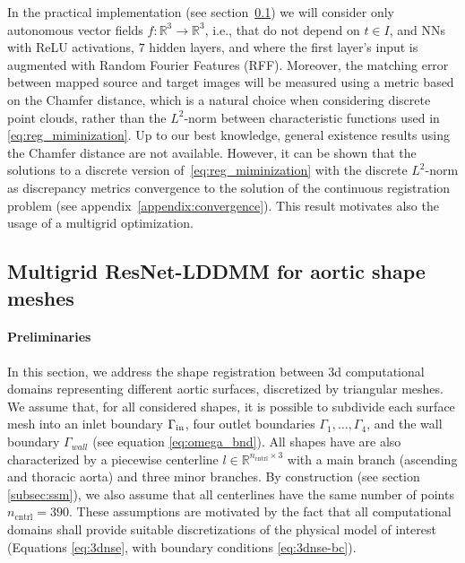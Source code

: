 In the practical implementation (see section~\ref{subsec:resnetlddmm}) we will 
consider only autonomous vector fields $f:\mathbb{R}^3\rightarrow \mathbb{R}^3$, i.e., that do not depend on $t\in I$,  and
NNs with ReLU activations, $7$ hidden layers, and where the first layer's input is augmented with Random Fourier Features (RFF).
%
Moreover, the matching error between mapped source and target images will be measured using a metric based on the Chamfer distance, which is a natural choice
when considering discrete point clouds, rather than the $L^2$-norm between characteristic functions used in \eqref{eq:reg_miminization}.
Up to our best knowledge, general existence results using the Chamfer distance are not available. However, it can be
shown that the solutions to a discrete version of~\eqref{eq:reg_miminization} with the discrete $L^2$-norm as discrepancy metrics convergence to the solution of the continuous registration problem (see appendix~\ref{appendix:convergence}). This result motivates also the usage of a multigrid optimization.

\subsection{Multigrid ResNet-LDDMM for aortic shape meshes}
\label{subsec:resnetlddmm}

\paragraph{Preliminaries} 
In this section, we address the shape registration between 3d computational domains representing different aortic surfaces, discretized by triangular meshes.  
%
We assume that, for all considered shapes, it is possible to subdivide each surface mesh into an inlet boundary $\Gamma_{\rm in}$, four outlet boundaries $\Gamma_1, \hdots,\Gamma_4$, 
and the wall boundary $\Gamma_{wall}$ (see equation \eqref{eq:omega_bnd}).
%
All shapes have are also characterized by a piecewise centerline $l\in\mathbb{R}^{n_{\text{cntrl}}\times 3}$ with a main branch (ascending and thoracic aorta) and three minor branches.
By construction (see section \ref{subsec:ssm}), we also assume that all centerlines have the same number of points $n_{\text{cntrl}}=390$.
%
These assumptions are motivated by the fact that all computational domains shall provide suitable discretizations of the physical model of interest 
(Equations \eqref{eq:3dnse}, with boundary conditions \eqref{eq:3dnse-bc}).

